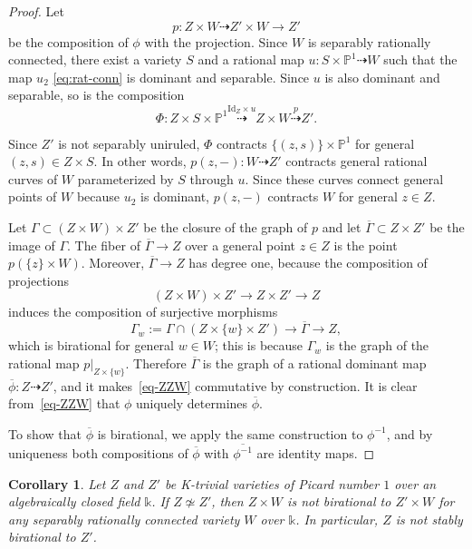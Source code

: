 \documentclass[a4paper,12pt]{amsart}
\def\k{\mathbb k}
\def\P{\mathbb P}
\def\ol{\overline}
\def\Id{{\mathrm{Id}}}
\theoremstyle{plain}
\newtheorem{cor}[dummy]{Corollary}
\numberwithin{equation}{section}
\theoremstyle{definition}
\newcommand{\cnec}{\mathrel{:=}}
\renewcommand{\(}{\left(}
\renewcommand{\)}{\right)}
\newcommand{\dto}{\dashrightarrow}
\begin{document}
\begin{proof}

Let 
$$p: Z \times W \dto Z' \times W \to  Z' $$
be the composition of $\phi$ with the projection.
Since $W$ is separably rationally connected,
there exist a variety $S$ and a rational map
$u : S \times \P^1 \dto W$ such that
the map $u_2$ \eqref{eq:rat-conn}
is dominant and separable.
Since $u$ is also dominant and separable,
so is the composition
$$\Phi: Z \times S \times \P^1 
\overset{\Id_Z \times u}{\dto} Z  \times W
\overset{p}{\dto} Z'.$$

Since $Z'$ is not separably uniruled, $\Phi$ contracts
$\{(z, s)\} \times \P^1$ for general $(z, s) \in Z \times S$.
In other words, $p(z,-): W \dto Z'$ 
contracts general rational curves of $W$ parameterized
by $S$ through $u$. 
Since these curves connect general points of $W$
because $u_2$ is dominant,
$p(z,-)$ contracts $W$ for general $z \in Z$. 

Let $\Gamma \subset (Z \times W) \times Z'$ be the closure of the graph
of $p$ and let $\ol{\Gamma} \subset Z \times Z'$ 
be the image of $\Gamma$.
The fiber of $\ol{\Gamma} \to Z$ over a general point 
$z \in Z$ is the point
$p(\{z\} \times W)$. 
Moreover, $\ol{\Gamma} \to Z$ has degree one,
because the composition of projections
$$(Z \times W) \times Z' \to Z \times Z' \to Z$$
induces the composition of surjective morphisms
$$\Gamma_w \cnec \Gamma \cap (Z \times \{w\} \times Z')
\to \ol{\Gamma} \to Z,$$
which is birational for general $w \in W$;
this is because $\Gamma_w$ is the graph of the rational
map $p|_{Z \times \{w\}}$.
Therefore $\ol{\Gamma}$
is the graph of a rational dominant map $\ol{\phi}: Z \dto Z'$,
and it makes~\eqref{eq-ZZW} commutative by construction.
It is clear from~\eqref{eq-ZZW} that $\phi$ uniquely determines $\ol{\phi}$.

To show that $\ol{\phi}$ is birational,
we apply the same construction
to $\phi^{-1}$, and by uniqueness
both compositions of
$\ol{\phi}$ with
$\ol{\phi^{-1}}$ are identity maps.
\end{proof}




\begin{cor}\label{cor-CYnSB} 
Let $Z$ and $Z'$ be K-trivial varieties 
of Picard number $1$
over 
an algebraically closed field $\k$.
If $Z \not\simeq Z'$,
then $Z \times W$ is not birational to $Z' \times W$
for any separably rationally connected variety $W$ over $\k$.
In particular, $Z$ is not stably birational to $Z'$.
\end{cor}
\end{document}
